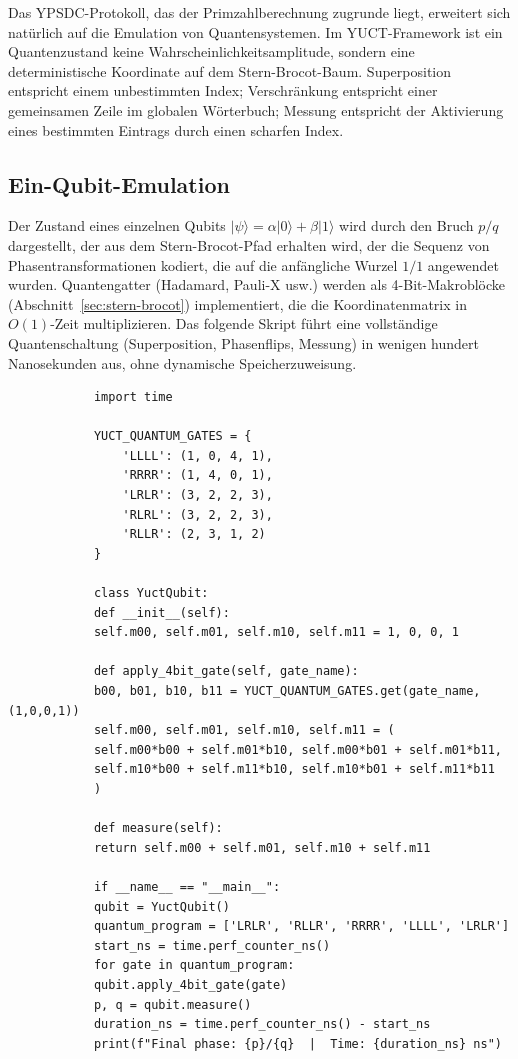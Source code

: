 \documentclass[11pt,a4paper]{article}
\begin{document}
	Das YPSDC-Protokoll, das der Primzahlberechnung zugrunde liegt, erweitert sich natürlich auf die Emulation von Quantensystemen. Im YUCT-Framework ist ein Quantenzustand keine Wahrscheinlichkeitsamplitude, sondern eine deterministische Koordinate auf dem Stern-Brocot-Baum. Superposition entspricht einem unbestimmten Index; Verschränkung entspricht einer gemeinsamen Zeile im globalen Wörterbuch; Messung entspricht der Aktivierung eines bestimmten Eintrags durch einen scharfen Index.
	
	\subsection{Ein-Qubit-Emulation}
	
	Der Zustand eines einzelnen Qubits \(\vert\psi\rangle = \alpha\vert0\rangle + \beta\vert1\rangle\) wird durch den Bruch \(p/q\) dargestellt, der aus dem Stern-Brocot-Pfad erhalten wird, der die Sequenz von Phasentransformationen kodiert, die auf die anfängliche Wurzel \(1/1\) angewendet wurden. Quantengatter (Hadamard, Pauli-X usw.) werden als 4-Bit-Makroblöcke (Abschnitt~\ref{sec:stern-brocot}) implementiert, die die Koordinatenmatrix in \(O(1)\)-Zeit multiplizieren. Das folgende Skript führt eine vollständige Quantenschaltung (Superposition, Phasenflips, Messung) in wenigen hundert Nanosekunden aus, ohne dynamische Speicherzuweisung.
	
	\begin{tcolorbox}[title=YUCT-Ein-Qubit-Emulator (Python), breakable]
		\begin{lstlisting}
			import time
			
			YUCT_QUANTUM_GATES = {
				'LLLL': (1, 0, 4, 1),
				'RRRR': (1, 4, 0, 1),
				'LRLR': (3, 2, 2, 3),
				'RLRL': (3, 2, 2, 3),
				'RLLR': (2, 3, 1, 2)
			}
			
			class YuctQubit:
			def __init__(self):
			self.m00, self.m01, self.m10, self.m11 = 1, 0, 0, 1
			
			def apply_4bit_gate(self, gate_name):
			b00, b01, b10, b11 = YUCT_QUANTUM_GATES.get(gate_name, (1,0,0,1))
			self.m00, self.m01, self.m10, self.m11 = (
			self.m00*b00 + self.m01*b10, self.m00*b01 + self.m01*b11,
			self.m10*b00 + self.m11*b10, self.m10*b01 + self.m11*b11
			)
			
			def measure(self):
			return self.m00 + self.m01, self.m10 + self.m11
			
			if __name__ == "__main__":
			qubit = YuctQubit()
			quantum_program = ['LRLR', 'RLLR', 'RRRR', 'LLLL', 'LRLR']
			start_ns = time.perf_counter_ns()
			for gate in quantum_program:
			qubit.apply_4bit_gate(gate)
			p, q = qubit.measure()
			duration_ns = time.perf_counter_ns() - start_ns
			print(f"Final phase: {p}/{q}  |  Time: {duration_ns} ns")
		\end{lstlisting}
	\end{tcolorbox}
	
\end{document}
